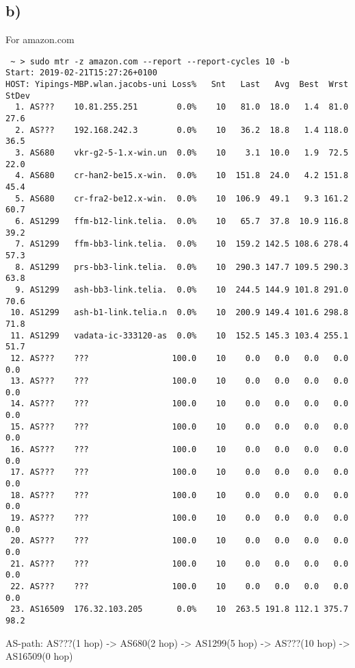 \documentclass[11pt]{article}
\begin{document}
\subsection{b)}
\label{sec:org02b15c2}
For amazon.com
\begin{verbatim}
 ~ > sudo mtr -z amazon.com --report --report-cycles 10 -b
Start: 2019-02-21T15:27:26+0100
HOST: Yipings-MBP.wlan.jacobs-uni Loss%   Snt   Last   Avg  Best  Wrst StDev
  1. AS???    10.81.255.251        0.0%    10   81.0  18.0   1.4  81.0  27.6
  2. AS???    192.168.242.3        0.0%    10   36.2  18.8   1.4 118.0  36.5
  3. AS680    vkr-g2-5-1.x-win.un  0.0%    10    3.1  10.0   1.9  72.5  22.0
  4. AS680    cr-han2-be15.x-win.  0.0%    10  151.8  24.0   4.2 151.8  45.4
  5. AS680    cr-fra2-be12.x-win.  0.0%    10  106.9  49.1   9.3 161.2  60.7
  6. AS1299   ffm-b12-link.telia.  0.0%    10   65.7  37.8  10.9 116.8  39.2
  7. AS1299   ffm-bb3-link.telia.  0.0%    10  159.2 142.5 108.6 278.4  57.3
  8. AS1299   prs-bb3-link.telia.  0.0%    10  290.3 147.7 109.5 290.3  63.8
  9. AS1299   ash-bb3-link.telia.  0.0%    10  244.5 144.9 101.8 291.0  70.6
 10. AS1299   ash-b1-link.telia.n  0.0%    10  200.9 149.4 101.6 298.8  71.8
 11. AS1299   vadata-ic-333120-as  0.0%    10  152.5 145.3 103.4 255.1  51.7
 12. AS???    ???                 100.0    10    0.0   0.0   0.0   0.0   0.0
 13. AS???    ???                 100.0    10    0.0   0.0   0.0   0.0   0.0
 14. AS???    ???                 100.0    10    0.0   0.0   0.0   0.0   0.0
 15. AS???    ???                 100.0    10    0.0   0.0   0.0   0.0   0.0
 16. AS???    ???                 100.0    10    0.0   0.0   0.0   0.0   0.0
 17. AS???    ???                 100.0    10    0.0   0.0   0.0   0.0   0.0
 18. AS???    ???                 100.0    10    0.0   0.0   0.0   0.0   0.0
 19. AS???    ???                 100.0    10    0.0   0.0   0.0   0.0   0.0
 20. AS???    ???                 100.0    10    0.0   0.0   0.0   0.0   0.0
 21. AS???    ???                 100.0    10    0.0   0.0   0.0   0.0   0.0
 22. AS???    ???                 100.0    10    0.0   0.0   0.0   0.0   0.0
 23. AS16509  176.32.103.205       0.0%    10  263.5 191.8 112.1 375.7  98.2

\end{verbatim}
AS-path: AS???(1 hop) -> AS680(2 hop) -> AS1299(5 hop) -> AS???(10 hop) -> AS16509(0 hop)
\end{document}
